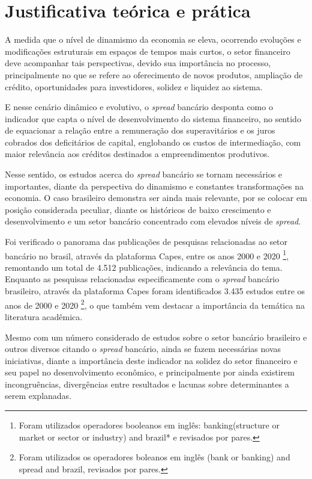 \documentclass[
  12pt,
  12pt,
  openright,
  oneside,
  a4paper,
  chapter=TITLE,
  section=TITLE,
  subsection=TITLE,
  subsubsection=TITLE,
  english,
  portugues,
  sumario=tradicional]{abntex2}
\begin{document}
\section{Justificativa teórica e prática}

A medida que o nível de dinamismo da economia se eleva, ocorrendo evoluções e modificações estruturais em espaços de tempos mais curtos, o setor financeiro deve acompanhar tais perspectivas, devido sua importância no processo, principalmente no que se refere ao oferecimento de novos produtos, ampliação de crédito, oportunidades para investidores, solidez e liquidez ao sistema.

E nesse cenário dinâmico e evolutivo, o \emph{spread} bancário desponta como o indicador que capta o nível de desenvolvimento do sistema financeiro, no sentido de equacionar a relação entre a remuneração dos superavitários e os juros cobrados dos deficitários de capital, englobando os custos de intermediação, com maior relevância aos créditos destinados a empreendimentos produtivos.

Nesse sentido, os estudos acerca do \emph{spread} bancário se tornam necessários e importantes, diante da perspectiva do dinamismo e constantes transformações na economia. O caso brasileiro demonstra ser ainda mais relevante, por se colocar em posição considerada peculiar, diante os históricos de baixo crescimento e desenvolvimento e um setor bancário concentrado com elevados níveis de \emph{spread}.

Foi verificado o panorama das publicações de pesquisas relacionadas ao setor bancário no brasil, através da plataforma Capes, entre os anos 2000 e 2020
\footnote{Foram utilizados operadores booleanos em inglês: banking(structure or
market or sector or industry) and brazil* e revisados por pares.}, remontando um total de 4.512 publicações, indicando a relevância do tema. Enquanto as pesquisas relacionadas especificamente com o \emph{spread} bancário brasileiro, através da plataforma Capes foram identificados 3.435 estudos entre os anos de 2000 e 2020 \footnote{Foram utilizados os operadores boleanos em
inglês (bank or banking) and spread and brazil, revisados por pares.}, o que também vem destacar a importância da temática na literatura acadêmica.

Mesmo com um número considerado de estudos sobre o setor bancário brasileiro e outros diversos citando o \emph{spread} bancário, ainda se fazem necessárias novas iniciativas, diante a importância deste indicador na solidez do setor financeiro e seu papel no desenvolvimento econômico, e principalmente por ainda existirem incongruências, divergências entre resultados e lacunas sobre determinantes a serem explanadas.
\end{document}
